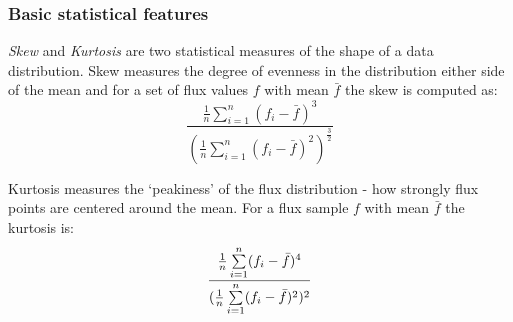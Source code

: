 	

	\subsubsection{Basic statistical features}
	\emph{Skew} and \emph{Kurtosis} are two statistical measures of the shape of a data distribution. Skew measures the degree of evenness in the distribution either side of the mean and for a set of flux values $f$ with mean $\bar{f}$ the skew is computed as:
	\begin{equation}
		\frac{\frac{1}{n}\sum\limits^{n}_{i=1}(f_{i} - \bar{f})^{3}}
		{(\frac{1}{n}\sum\limits^{n}_{i=1}(f_{i} - \bar{f})^{2})^{\frac{3}{2}}}
	\end{equation}
	
	Kurtosis measures the `peakiness' of the flux distribution - how strongly flux points are centered around the mean. For a flux sample $f$ with mean $\bar{f}$ the kurtosis is:
	\begin{equation}
		\frac{\frac{1}{n}\sum\limits^{n}_{i=1}(f_{i} - \bar{f})^{4}}
		{(\frac{1}{n}\sum\limits^{n}_{i=1}(f_{i} - \bar{f})^{2})^{2}} \\
	\end{equation}
	
